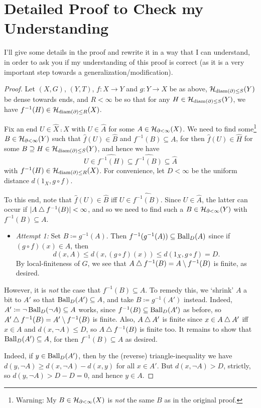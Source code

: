\documentclass{amsart}
\begin{document}
    \setcounter{section}{1}
    \section{Detailed Proof to Check my Understanding}

    I'll give some details in the proof and rewrite it in a way that I can understand, in order to ask you if my understanding of this proof is correct (as it is a very important step towards a generalization/modification).

    \begin{proof}
        Let $(X,G)$, $(Y,T)$, $f:X\to Y$ and $g:Y\to X$ be as above, $\mathcal{H}_{\operatorname{diam}(\partial)\leq S}(Y)$ be dense towards ends, and $R<\infty$ be so that for any $H\in\mathcal{H}_{\operatorname{diam}(\partial)\leq S}(Y)$, we have $f^{-1}(H)\in\mathcal{H}_{\operatorname{diam}(\partial)\leq R}(X)$.

        Fix an end $U\in\widehat{X}\comp X$ with $U\in\widehat{A}$ for some $A\in\mathcal{H}_{\partial<\infty}(X)$. We need to find some\footnote{Warning: My $B\in\mathcal{H}_{\partial<\infty}(X)$ is \textit{not} the same $B$ as in the original proof.} $B\in\mathcal{H}_{\partial<\infty}(Y)$ such that $\widehat{f}(U)\in\widehat{B}$ and $f^{-1}(B)\subseteq A$, for then $\widehat{f}(U)\in\widehat{H}$ for some $B\supseteq H\in\mathcal{H}_{\operatorname{diam}(\partial)\leq S}(Y)$, and hence we have
        \begin{equation*}
            U\in\widehat{f^{-1}(H)}\subseteq\widehat{f^{-1}(B)}\subseteq\widehat{A}
        \end{equation*}
        with $f^{-1}(H)\in\mathcal{H}_{\operatorname{diam}(\partial)\leq R}(X)$. For convenience, let $D<\infty$ be the uniform distance $d(1_X,g\circ f)$.

        To this end, note that $\widehat{f}(U)\in\widehat{B}$ iff $U\in\widehat{f^{-1}(B)}$. Since $U\in\widehat{A}$, the latter can occur if $|A\bigtriangleup f^{-1}(B)|<\infty$, and so we need to find such a $B\in\mathcal{H}_{\partial<\infty}(Y)$ with $f^{-1}(B)\subseteq A$.
        \begin{itemize}
            \item \textit{Attempt 1:} Set $B\coloneqq g^{-1}(A)$. Then $f^{-1}(g^{-1}(A))\subseteq\operatorname{Ball}_D(A)$ since if $(g\circ f)(x)\in A$, then
                \begin{equation*}
                    d(x,A)\leq d(x,(g\circ f)(x))\leq d(1_X,g\circ f)=D.
                \end{equation*}
            By local-finiteness of $G$, we see that $A\bigtriangleup f^{-1}(B)=A\setminus f^{-1}(B)$ is finite, as desired.
        \end{itemize}
        However, it is \textit{not} the case that $f^{-1}(B)\subseteq A$. To remedy this, we `shrink' $A$ a bit to $A'$ so that $\operatorname{Ball}_D(A')\subseteq A$, and take $B\coloneqq g^{-1}(A')$ instead. Indeed, $A'\coloneqq\lnot\operatorname{Ball}_D(\lnot A)\subseteq A$ works, since $f^{-1}(B)\subseteq\operatorname{Ball}_D(A')$ as before, so $A'\bigtriangleup f^{-1}(B)=A'\setminus f^{-1}(B)$ is finite. Also, $A\bigtriangleup A'$ is finite since $x\in A\bigtriangleup A'$ iff $x\in A$ and $d(x,\lnot A)\leq D$, so $A\bigtriangleup f^{-1}(B)$ is finite too. It remains to show that $\operatorname{Ball}_D(A')\subseteq A$, for then $f^{-1}(B)\subseteq A$ as desired.

        Indeed, if $y\in\operatorname{Ball}_D(A')$, then by the (reverse) triangle-inequality we have $d(y,\lnot A)\geq d(x,\lnot A)-d(x,y)$ for all $x\in A'$. But $d(x,\lnot A)>D$, strictly, so $d(y,\lnot A)>D-D=0$, and hence $y\in A$.
    \end{proof}
\end{document}
